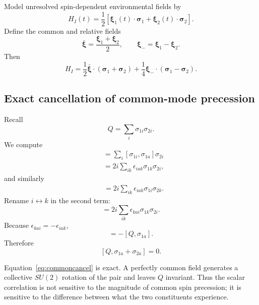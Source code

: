 \documentclass[11pt]{article}
\newcommand{\eps}{\epsilon}
\begin{document}
Model unresolved spin-dependent environmental fields by
\begin{equation}
H_I(t)
=\frac12\left[
\bm\xi_1(t)\cdot\bm\sigma_1
+\bm\xi_2(t)\cdot\bm\sigma_2
\right].
\label{eq:stochH}
\end{equation}
Define the common and relative fields
\begin{equation}
\bar{\bm\xi}
=\frac{\bm\xi_1+\bm\xi_2}{2},
\qquad
\bm\xi_-
=\bm\xi_1-\bm\xi_2.
\end{equation}
Then
\begin{equation}
H_I
=\frac12\bar{\bm\xi}\cdot(\bm\sigma_1+\bm\sigma_2)
+\frac14\bm\xi_-\cdot(\bm\sigma_1-\bm\sigma_2).
\label{eq:commonrelative}
\end{equation}

\subsection{Exact cancellation of common-mode precession}

Recall
\begin{equation}
Q=\sum_i\sigma_{1i}\sigma_{2i}.
\end{equation}
We compute
\begin{align}
[Q,\sigma_{1a}]
&=\sum_i[\sigma_{1i},\sigma_{1a}]\sigma_{2i}\\
&=2i\sum_{ik}\eps_{iak}\sigma_{1k}\sigma_{2i},
\end{align}
and similarly
\begin{align}
[Q,\sigma_{2a}]
&=2i\sum_{ik}\eps_{iak}\sigma_{1i}\sigma_{2k}.
\end{align}
Rename $i\leftrightarrow k$ in the second term:
\begin{equation}
[Q,\sigma_{2a}]
=2i\sum_{ik}\eps_{kai}\sigma_{1k}\sigma_{2i}.
\end{equation}
Because $\eps_{kai}=-\eps_{iak}$,
\begin{equation}
[Q,\sigma_{2a}]=-[Q,\sigma_{1a}].
\end{equation}
Therefore
\begin{equation}
\boxed{
[Q,\sigma_{1a}+\sigma_{2a}]=0.
}
\label{eq:commoncancel}
\end{equation}

Equation~\eqref{eq:commoncancel} is exact. A perfectly common field generates a collective $SU(2)$ rotation of the pair and leaves $Q$ invariant. Thus the scalar correlation is not sensitive to the magnitude of common spin precession; it is sensitive to the difference between what the two constituents experience.
\end{document}
